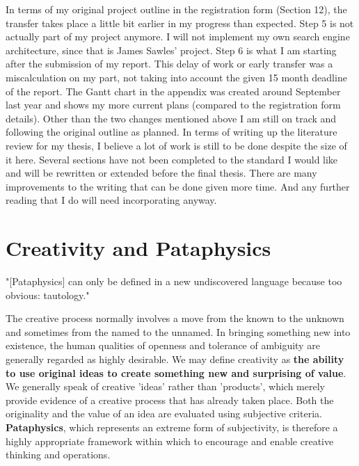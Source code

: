In terms of my original project outline in the registration form (Section 12), the transfer takes place a little bit earlier in my progress than expected. Step 5 is not actually part of my project anymore. I will not implement my own search engine architecture, since that is James Sawles' project. Step 6 is what I am starting after the submission of my report. This delay of work or early transfer was a miscalculation on my part, not taking into account the given 15 month deadline of the report. The Gantt chart in the appendix was created around September last year and shows my more current plans (compared to the registration form details). Other than the two changes mentioned above I am still on track and following the original outline as planned.
In terms of writing up the literature review for my thesis, I believe a lot of work is still to be done despite the size of it here. Several sections have not been completed to the standard I would like and will be rewritten or extended before the final thesis. There are many improvements to the writing that can be done given more time.  And any further reading that I do will need incorporating anyway.

\section{Creativity and Pataphysics}

"[Pataphysics] can only be defined in a new undiscovered language because too obvious: tautology." \citep{Baudrillard2007}

The creative process normally involves a move from the known to the unknown and sometimes from the named to the unnamed. In bringing something new into existence, the human qualities of openness and tolerance of ambiguity are generally regarded as highly desirable. We may define creativity as \textbf{the ability to use original ideas to create something new and surprising of value}. We generally speak of creative 'ideas' rather than 'products', which merely provide evidence of a creative process that has already taken place. Both the originality and the value of an idea are evaluated using subjective criteria. \textbf{Pataphysics}, which represents an extreme form of subjectivity, is therefore a highly appropriate framework within which to encourage and enable creative thinking and operations.

